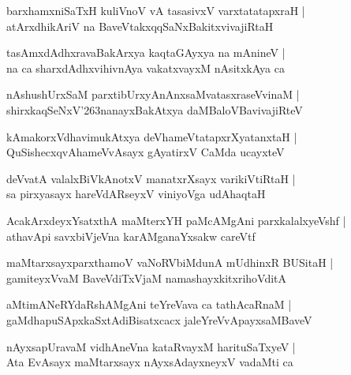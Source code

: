 \documentclass[twoside,12pt,openright]{book}
\def\S{\char'263}
\newcounter{shloka}[chapter]
\begin{document}
\begin{shloka}%
barxhamxniSaTxH kuliVnoV vA tasasivxV varxtatatapxraH |\\
atArxdhikAriV na BaveVtakxqqSaNxBakitxvivajiRtaH 
\end{shloka}

\begin{shloka}%
tasAmxdAdhxravaBakArxya kaqtaGAyxya na mAnineV |\\
na ca sharxdAdhxvihivnAya vakatxvayxM nAsitxkAya ca 
\end{shloka}

\begin{shloka}%
nAshushUrxSaM parxtibUrxyAnAnxsaMvatasxraseVvinaM |\\
shirxkaqSeNxV\S nanayxBakAtxya daMBaloVBavivajiRteV 
\end{shloka}

\begin{shloka}%
kAmakorxVdhavimukAtxya deVhameVtatapxrXyatanxtaH |\\
QuSishecxqvAhameVvAsayx gAyatirxV CaMda ucayxteV 
\end{shloka}

\begin{shloka}%
deVvatA valalxBiVkAnotxV manatxrXsayx varikiVtiRtaH |\\
sa pirxyasayx hareVdARseyxV viniyoVga udAhaqtaH 
\end{shloka}

\begin{shloka}%
AcakArxdeyxYsatxthA maMterxYH paMcAMgAni parxkalalxyeVshf |\\
athavApi savxbiVjeVna karAMganaYxsakw careVtf
\end{shloka}

\begin{shloka}%
maMtarxsayxparxthamoV vaNoRVbiMdunA mUdhinxR BUSitaH |\\
gamiteyxVvaM BaveVdiTxVjaM namashayxkitxrihoVditA 
\end{shloka}

\begin{shloka}%
aMtimANeRYdaRshAMgAni teYreVava ca tathAcaRnaM |\\
gaMdhapuSApxkaSxtAdiBisatxcacx jaleYreVvApayxsaMBaveV
\end{shloka}

\begin{shloka}%
nAyxsapUravaM vidhAneVna kataRvayxM harituSaTxyeV |\\
Ata EvAsayx maMtarxsayx nAyxsAdayxneyxV vadaMti ca
\end{shloka}
\end{document}

